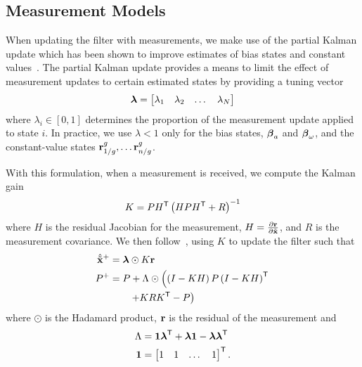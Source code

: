 
\subsection{Measurement Models}
\label{sec:measurement_models}

When
updating the filter with measurements, we make use of the partial Kalman update
which has been shown to improve estimates of bias states and constant values~\cite{brink2017partial}. The partial Kalman update provides a
means to limit the effect of measurement updates to certain estimated
states by providing a tuning vector
\begin{equation}
  \boldsymbol{\mathrm{\lambda}} =
\begin{bmatrix}
  \lambda_1 & \lambda_2 & \dots & \lambda_N
\end{bmatrix}
\end{equation}
where $\lambda_i \in \left[ 0, 1\right]$ determines the proportion of the
measurement update applied to state $i$.
In practice, we use $\lambda < 1$ only for the
bias states, $\boldsymbol{\mathrm{\beta}}_a$ and $\boldsymbol{\mathrm{\beta}}_\omega$, and the
constant-value states $\vect{r}_{1/g}^{g}, \dots \vect{r}_{n/g}^{g}$.

With this formulation,
when a measurement is received, we compute the Kalman gain
\begin{equation}
  K = P H^{\mathsf{T}} \left(H P H^{\mathsf{T}} + R \right)^{-1}
\end{equation}
where $H$ is the residual Jacobian for the measurement,
$H=\frac{\partial \boldsymbol{\mathrm{r}}}{\partial \tilde{\boldsymbol{\mathrm{x}}}}$,
and $R$ is the
measurement covariance. We then follow~\cite{brink2017partial}, using $K$ to update the filter such that
\begin{align}
  \hat{\tilde{\boldsymbol{\mathrm{x}}}}^{+} &= \boldsymbol{\mathrm{\lambda}} \odot K \boldsymbol{\mathrm{r}} \\
  P^{+} &= P + \Lambda \odot \left( \left(I - K H \right) P \left(I - K H
  \right)^{\mathsf{T}} \right. \\
  & \qquad \left. + K R K^{\mathsf{T}} - P \right) \nonumber
\end{align}
where $\odot$ is the Hadamard product, $\boldsymbol{\mathrm{r}}$ is the residual of the
measurement and
\begin{align}
  \Lambda &= \boldsymbol{\mathrm{1}} \boldsymbol{\mathrm{\lambda}}^{\mathsf{T}} + \boldsymbol{\mathrm{\lambda}} \boldsymbol{\mathrm{1}} -
  \boldsymbol{\mathrm{\lambda}} \boldsymbol{\mathrm{\lambda}}^{\mathsf{T}} \\
  \boldsymbol{\mathrm{1}} &= \begin{bmatrix} 1 & 1 & \dots & 1 \end{bmatrix}^{\mathsf{T}} .
\end{align}

